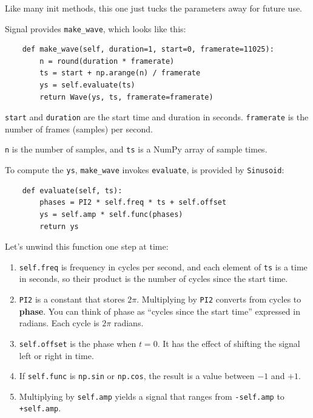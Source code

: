 \documentclass[12pt]{book}
\begin{document}
Like many init methods, this one just tucks the parameters away for
future use.

Signal provides \verb"make_wave", which looks like
this:

\begin{verbatim}
    def make_wave(self, duration=1, start=0, framerate=11025):
        n = round(duration * framerate)
        ts = start + np.arange(n) / framerate
        ys = self.evaluate(ts)
        return Wave(ys, ts, framerate=framerate)
\end{verbatim}

{\tt start} and {\tt duration} are the start time and duration
in seconds.  {\tt framerate} is the number of frames (samples)
per second.

{\tt n} is the number of samples, and {\tt ts} is a NumPy array
of sample times.

To compute the {\tt ys}, \verb"make_wave" invokes {\tt evaluate}, 
is provided by {\tt Sinusoid}:

\begin{verbatim}
    def evaluate(self, ts):
        phases = PI2 * self.freq * ts + self.offset
        ys = self.amp * self.func(phases)
        return ys
\end{verbatim}

Let's unwind this function one step at time:

\begin{enumerate}

\item {\tt self.freq} is frequency in cycles per second, and each
  element of {\tt ts} is a time in seconds, so their product is the
  number of cycles since the start time.

\item {\tt PI2} is a constant that stores $2 \pi$.  Multiplying by
  {\tt PI2} converts from cycles to {\bf phase}.  You can think of
  phase as ``cycles since the start time'' expressed in radians.  Each
  cycle is $2 \pi$ radians.

\item {\tt self.offset} is the phase when $t=0$.
  It has the effect of shifting the signal left or right in time.

\item If {\tt self.func} is {\tt np.sin} or {\tt np.cos}, the result is a
  value between $-1$ and $+1$.

\item Multiplying by {\tt self.amp} yields a signal that ranges from
  {\tt -self.amp} to {\tt +self.amp}.

\end{enumerate}
\end{document}
